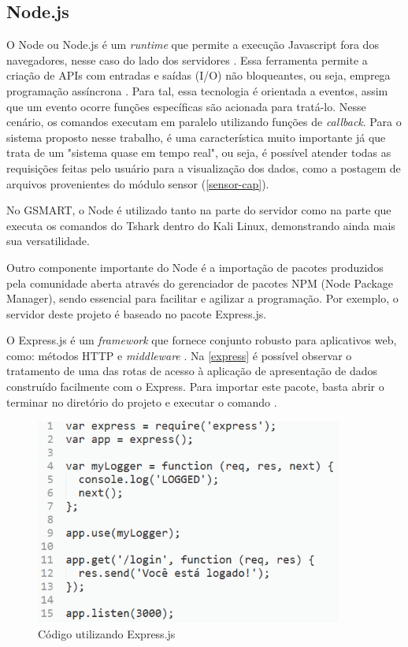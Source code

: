 \subsection{Node.js}
O Node ou Node.js é um \emph{runtime} que permite a execução Javascript fora dos navegadores, nesse caso do lado dos servidores \cite{node}.
Essa ferramenta permite a criação de APIs com entradas e saídas (I/O) não bloqueantes, ou seja, emprega programação assíncrona \cite{Dzone}. Para tal, essa tecnologia é orientada a eventos, assim que um evento ocorre funções específicas são
acionada para tratá-lo. Nesse cenário, os comandos executam em paralelo utilizando funções de \emph{callback}. Para o sistema proposto nesse trabalho, é uma característica muito importante
já que trata de um "sistema quase em tempo real", ou seja, é possível atender todas as requisições feitas pelo usuário para a visualização dos dados, como
a postagem de arquivos provenientes do módulo sensor (\autoref{sensor-cap}).

No GSMART, o Node é utilizado tanto na parte do servidor como na parte que executa os comandos do Tshark dentro do Kali Linux, demonstrando ainda mais sua versatilidade.

Outro componente importante do Node é a importação de pacotes produzidos pela comunidade aberta através do gerenciador de pacotes NPM (Node
Package Manager), sendo essencial para facilitar e agilizar a programação. Por exemplo, o servidor deste projeto é baseado no pacote Express.js.

O Express.js é um \emph{framework} que fornece conjunto robusto para aplicativos web, como: métodos HTTP e \emph{middleware} \cite{express}. Na \autoref{express} é possível observar o tratamento
de uma das rotas de acesso à aplicação de apresentação de dados construído facilmente com o Express. Para importar este pacote, basta abrir o terminar no diretório do projeto e executar o comando .

\begin{figure}[htb]
  \caption{\label{express}Código utilizando Express.js}
  \begin{center}
    \includegraphics[width=0.90\textwidth]{img/express.png}
  \end{center}
\end{figure}

